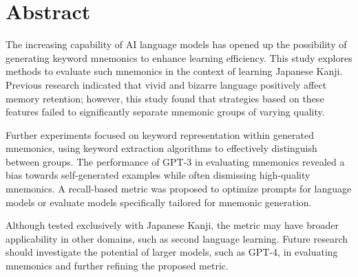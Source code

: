 \section*{Abstract}

The increasing capability of AI language models has opened up the possibility of generating keyword mnemonics to enhance learning efficiency. This study explores methods to evaluate such mnemonics in the context of learning Japanese Kanji. Previous research indicated that vivid and bizarre language positively affect memory retention; however, this study found that strategies based on these features failed to significantly separate mnemonic groups of varying quality.

Further experiments focused on keyword representation within generated mnemonics, using keyword extraction algorithms to effectively distinguish between groups. The performance of GPT-3 in evaluating mnemonics revealed a bias towards self-generated examples while often dismissing high-quality mnemonics. A recall-based metric was proposed to optimize prompts for language models or evaluate models specifically tailored for mnemonic generation.

Although tested exclusively with Japanese Kanji, the metric may have broader applicability in other domains, such as second language learning. Future research should investigate the potential of larger models, such as GPT-4, in evaluating mnemonics and further refining the proposed metric.
